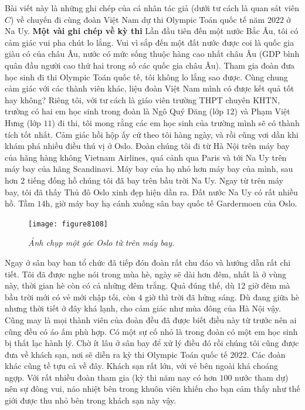\begin{multicols}{2}
	Bài viết này là những ghi chép của cá nhân tác giả (dưới tư cách là quan sát viên $C$) về chuyến đi cùng đoàn Việt Nam dự thi Olympic Toán quốc tế năm $2022$ ở Na Uy.
	\vskip 0.05cm
	{\bf\color{cackithi}Một vài ghi chép về kỳ thi}
	\vskip 0.05cm
	Lần đầu tiên đến một nước Bắc Âu, tôi có cảm giác vui pha chút lo lắng. Vui vì sắp đến một đất nước được coi là quốc gia giàu có của châu Âu, nước có mức sống thuộc hàng cao nhất châu Âu (GDP bình quân đầu người cao thứ hai trong số các quốc gia châu Âu). Tham gia đoàn đưa học sinh đi thi Olympic Toán quốc tế, tôi không lo lắng sao được. Cùng chung cảm giác với các thành viên khác, liệu đoàn Việt Nam mình có được kết quả tốt hay không? Riêng tôi, với tư cách là giáo viên trường THPT chuyên KHTN, trường có hai em học sinh trong đoàn là Ngô Quý Đăng (lớp $12$) và Phạm Việt Hưng (lớp $11$) đi thi, tôi mong rằng các em học sinh của trường mình sẽ có thành tích tốt nhất. Cảm giác hồi hộp ấy cứ theo tôi hàng ngày, và rồi cũng vơi dần khi khám phá nhiều điều thú vị ở Oslo.
	\vskip 0.05cm
	Đoàn chúng tôi đi từ Hà Nội trên máy bay của hãng hàng không Vietnam Airlines, quá cảnh qua Paris và tới Na Uy trên máy bay của hãng Scandinavi. Máy bay của họ nhỏ hơn máy bay của mình, sau hơn $2$ tiếng đống hồ chúng tôi đã bay trên bầu trời Na Uy. Ngay từ trên máy bay, tôi đã thấy Thủ đô Oslo xinh đẹp hiện dần ra. Đất nước Na Uy có rất nhiều hồ. Tầm $14$h, giờ máy bay hạ cánh xuống sân bay quốc tế Gardermoen của Oslo.
	\begin{figure}[H]
		\vspace*{-5pt}
		\centering
		\captionsetup{labelformat= empty, justification=centering}
		\texttt{[image: figure8108]}
		\caption{\small\textit{\color{cackithi}Ảnh chụp một góc Oslo từ trên máy bay.}}
		\vspace*{-10pt}
	\end{figure}
	Ngay ở sân bay ban tổ chức đã tiếp đón đoàn rất chu đáo và hướng dẫn rất chi tiết. Tôi đã được nghe nói trong mùa hè, ngày sẽ dài hơn đêm, nhất là ở vùng này, thời gian hè còn có cả những đêm trắng. Quả đúng thế, dù $12$ giờ đêm mà bầu trời mới có vẻ mới chập tối, còn $4$ giờ thì trời đã hửng sáng. Dù đang giữa hè nhưng thời tiết ở đây khá lạnh, cho cảm giác như mùa đông của Hà Nội vậy. Cũng may là mọi thành viên của đoàn đều đã được biết điều này từ trước nên ai cũng đều có áo ấm phù hợp. Có một sự cố nhỏ là trong đoàn có một em học sinh bị thất lạc hành lý. Chờ ít lâu ở sân bay để xử lý điều đó rồi chúng tôi cũng được đưa về khách sạn, nơi sẽ diễn ra kỳ thi Olympic Toán quốc tế $2022$. Các đoàn khác cũng tề tựu cả về đây. Khách sạn rất lớn, với vẻ bên ngoài khá choáng ngợp. Với rất nhiều đoàn tham gia (kỳ thi năm nay có hơn $100$ nước tham dự) nên sự đông vui, náo nhiệt bên trong khuôn viên khiến cho bạn cảm thấy như thế giới được thu nhỏ bên trong khách sạn này vậy. 

\end{multicols}
